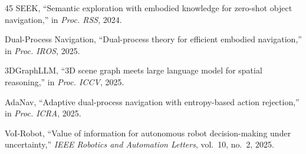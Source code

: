 \documentclass[conference]{IEEEtran}
\begin{document}
\begin{thebibliography}{45}
SEEK,
``Semantic exploration with embodied knowledge for zero-shot object navigation,''
in \emph{Proc. RSS}, 2024.

Dual-Process Navigation,
``Dual-process theory for efficient embodied navigation,''
in \emph{Proc. IROS}, 2025.

3DGraphLLM,
``3D scene graph meets large language model for spatial reasoning,''
in \emph{Proc. ICCV}, 2025.

AdaNav,
``Adaptive dual-process navigation with entropy-based action rejection,''
in \emph{Proc. ICRA}, 2025.

VoI-Robot,
``Value of information for autonomous robot decision-making under uncertainty,''
\emph{IEEE Robotics and Automation Letters}, vol.~10, no.~2, 2025.

\end{thebibliography}
\end{document}
